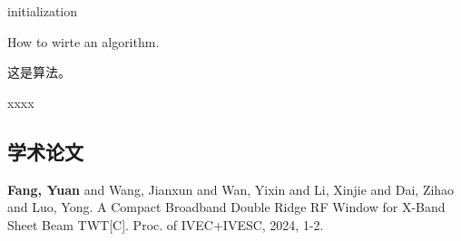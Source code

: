 \documentclass[master]{thesis-uestc}
\begin{document}
\begin{algorithm}[H]\label{alg:1}
    initialization\;
    \caption{How to wirte an algorithm.}
\end{algorithm}

这是算法。

\thesisacknowledgement

xxxx %



\begin{thesistheaccomplish}
    \section{学术论文}
     \textbf{Fang, Yuan} and Wang, Jianxun and Wan, Yixin and Li, Xinjie and Dai, Zihao and Luo, Yong. A Compact Broadband Double Ridge RF Window for X-Band Sheet Beam TWT[C]. Proc. of IVEC+IVESC, 2024, 1-2.
\end{thesistheaccomplish}


\end{document}
